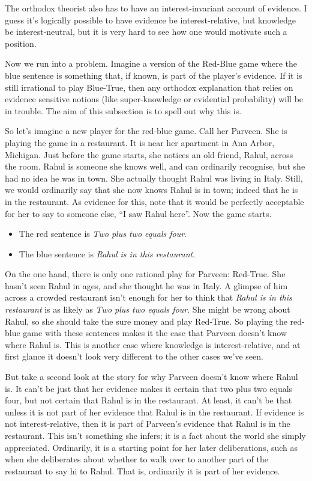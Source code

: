 \documentclass[
  10pt,
  letterpaper,
  twoside]{scrbook}
\providecommand{\tightlist}{%
  \setlength{\itemsep}{0pt}\setlength{\parskip}{0pt}}\usepackage{longtable,booktabs,array}
\begin{document}
The orthodox theorist also has to have an interest-invariant account of
evidence. I guess it's logically possible to have evidence be
interest-relative, but knowledge be interest-neutral, but it is very
hard to see how one would motivate such a position.

Now we run into a problem. Imagine a version of the Red-Blue game where
the blue sentence is something that, if known, is part of the player's
evidence. If it is still irrational to play Blue-True, then any orthodox
explanation that relies on evidence sensitive notions (like
super-knowledge or evidential probability) will be in trouble. The aim
of this subsection is to spell out why this is.

So let's imagine a new player for the red-blue game. Call her Parveen.
She is playing the game in a restaurant. It is near her apartment in Ann
Arbor, Michigan. Just before the game starts, she notices an old friend,
Rahul, across the room. Rahul is someone she knows well, and can
ordinarily recognise, but she had no idea he was in town. She actually
thought Rahul was living in Italy. Still, we would ordinarily say that
she now knows Rahul is in town; indeed that he is in the restaurant. As
evidence for this, note that it would be perfectly acceptable for her to
say to someone else, ``I saw Rahul here''. Now the game starts.

\begin{itemize}
\tightlist
\item
  The red sentence is \emph{Two plus two equals four}.
\item
  The blue sentence is \emph{Rahul is in this restaurant}.
\end{itemize}

On the one hand, there is only one rational play for Parveen: Red-True.
She hasn't seen Rahul in ages, and she thought he was in Italy. A
glimpse of him across a crowded restaurant isn't enough for her to think
that \emph{Rahul is in this restaurant} is as likely as \emph{Two plus
two equals four}. She might be wrong about Rahul, so she should take the
sure money and play Red-True. So playing the red-blue game with these
sentences makes it the case that Parveen doesn't know where Rahul is.
This is another case where knowledge is interest-relative, and at first
glance it doesn't look very different to the other cases we've seen.

But take a second look at the story for why Parveen doesn't know where
Rahul is. It can't be just that her evidence makes it certain that two
plus two equals four, but not certain that Rahul is in the restaurant.
At least, it can't be that unless it is not part of her evidence that
Rahul is in the restaurant. If evidence is not interest-relative, then
it is part of Parveen's evidence that Rahul is in the restaurant. This
isn't something she infers; it is a fact about the world she simply
appreciated. Ordinarily, it is a starting point for her later
deliberations, such as when she deliberates about whether to walk over
to another part of the restaurant to say hi to Rahul. That is,
ordinarily it is part of her evidence.
\end{document}

